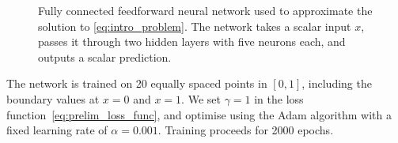 \begin{figure}[ht]
    \centering
    \caption{Fully connected feedforward neural network used to approximate the solution to
    \eqref{eq:intro_problem}. The network takes a scalar input \( x \), passes it through two 
    hidden layers with five neurons each, and outputs a scalar prediction.}
    \label{fig:preamble_neural_net}
\end{figure}

The network is trained on 20 equally spaced points in \([0, 1]\), including the boundary values 
at \( x = 0 \) and \( x = 1 \). We set \( \gamma = 1 \) in the loss function~\eqref{eq:prelim_loss_func}, 
and optimise using the Adam algorithm with a fixed learning rate of \( \alpha = 0.001 \). Training 
proceeds for 2000 epochs.

